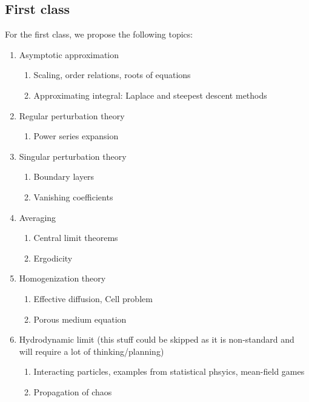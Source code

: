 \documentclass[12pt]{amsart}
\begin{document}
\subsection{First class}
For the first class, we propose the following topics:
\begin{enumerate}
    \item Asymptotic approximation 
        \begin{enumerate}
            \item Scaling, order relations, roots of equations
            \item Approximating integral: Laplace and steepest descent methods
        \end{enumerate}
    \item Regular perturbation theory
        \begin{enumerate}
            \item Power series expansion
        \end{enumerate}
    \item Singular perturbation theory
        \begin{enumerate}
            \item Boundary layers
            \item Vanishing coefficients 
        \end{enumerate}
    \item Averaging
        \begin{enumerate}
            \item Central limit theorems
            \item Ergodicity
        \end{enumerate}
    \item Homogenization theory
        \begin{enumerate}
            \item Effective diffusion, Cell problem
            \item Porous medium equation
        \end{enumerate}
\item Hydrodynamic limit 
    (this stuff could be skipped as it is 
    non-standard and will require a lot of thinking/planning)
        \begin{enumerate}
            \item Interacting particles, examples from statistical phsyics, mean-field games
            \item Propagation of chaos
        \end{enumerate}
\end{enumerate}
\end{document}
